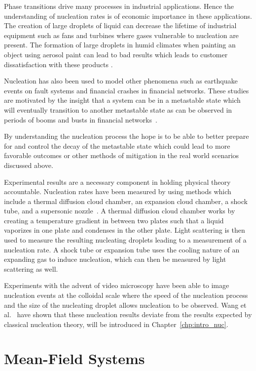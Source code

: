 Phase transitions drive many processes in industrial applications. Hence the understanding of nucleation rates is of economic importance in these applications. The creation of large droplets of liquid can decrease the lifetime of industrial equipment such as fans and turbines where gases vulnerable to nucleation are present. The formation of large droplets in humid climates when painting an object using aerosol paint can lead to bad results which leads to customer dissatisfaction with these products \cite{finishing}.

Nucleation has also been used to model other phenomena such as earthquake events on fault systems and financial crashes in financial networks. These studies are motivated by the insight that a system can be in a metastable state which will eventually transition to  another metastable state as can be observed in periods of booms and busts in financial networks~\cite{sornette_log}.

By understanding the nucleation process the hope is to be able to better prepare for and control the decay of the metastable state which could lead to more favorable outcomes or other methods of mitigation in the real world scenarios discussed above.  

Experimental results are a necessary component in holding physical theory accountable. Nucleation rates have been measured  by using methods which include a thermal diffusion cloud chamber, an expansion cloud chamber, a shock tube, and a supersonic nozzle~\cite{kalik12}. A thermal diffusion cloud chamber works by creating a temperature gradient in between two plates such that a liquid vaporizes in one plate and condenses in the other plate.  Light scattering is then used to measure the resulting nucleating droplets leading to a measurement of a nucleation rate.
A shock tube or expansion tube uses the cooling nature of an expanding gas to induce nucleation, which can then be measured by light scattering as well.

Experiments with the advent of video microscopy have been able to image nucleation events at the colloidal scale where the speed of the nucleation process and the size of the nucleating droplet allows nucleation to be observed.   Wang et al.~\cite{wang12} have shown that these nucleation results deviate from the results expected by classical nucleation theory,  will be introduced in Chapter~\ref{chp:intro_nuc}.

\section{Mean-Field Systems}

